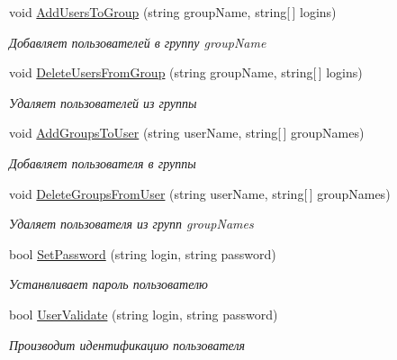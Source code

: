 \begin{DoxyCompactItemize}
void \hyperlink{interface_security_1_1_interfaces_1_1_i_security_tools_a6e6611d633949c2ec8f1a1c26bffa0c3}{Add\+Users\+To\+Group} (string group\+Name, string\mbox{[}$\,$\mbox{]} logins)
\begin{DoxyCompactList}\small\item\em Добавляет пользователей в группу group\+Name \end{DoxyCompactList}\item 
void \hyperlink{interface_security_1_1_interfaces_1_1_i_security_tools_ab485af1bb5beed54b2e0979cdde89bf3}{Delete\+Users\+From\+Group} (string group\+Name, string\mbox{[}$\,$\mbox{]} logins)
\begin{DoxyCompactList}\small\item\em Удаляет пользователей из группы \end{DoxyCompactList}\item 
void \hyperlink{interface_security_1_1_interfaces_1_1_i_security_tools_a98b41488f3151d21d3301f22cc0d3ece}{Add\+Groups\+To\+User} (string user\+Name, string\mbox{[}$\,$\mbox{]} group\+Names)
\begin{DoxyCompactList}\small\item\em Добавляет пользователя в группы \end{DoxyCompactList}\item 
void \hyperlink{interface_security_1_1_interfaces_1_1_i_security_tools_added0cc516586d965fbed16d84d1b97f}{Delete\+Groups\+From\+User} (string user\+Name, string\mbox{[}$\,$\mbox{]} group\+Names)
\begin{DoxyCompactList}\small\item\em Удаляет пользователя из групп group\+Names \end{DoxyCompactList}\item 
bool \hyperlink{interface_security_1_1_interfaces_1_1_i_security_tools_a102a74725900d13544f22353a239ed45}{Set\+Password} (string login, string password)
\begin{DoxyCompactList}\small\item\em Устанвливает пароль пользователю \end{DoxyCompactList}\item 
bool \hyperlink{interface_security_1_1_interfaces_1_1_i_security_tools_a26ab5bc4b978b996a6442968289467bb}{User\+Validate} (string login, string password)
\begin{DoxyCompactList}\small\item\em Производит идентификацию пользователя \end{DoxyCompactList}\item 

\end{DoxyCompactItemize}
